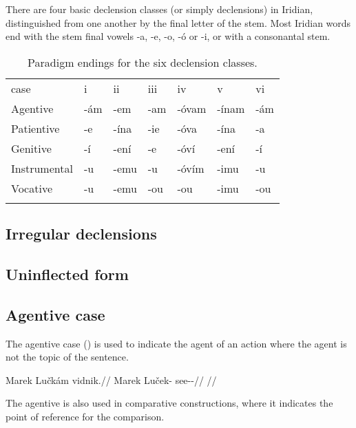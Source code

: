 There are four basic declension classes (or simply declensions) in Iridian, distinguished from one another by the final letter of the stem. Most Iridian words end with the stem final vowels -a, -e, -o, -ó or -i, or with a consonantal stem.


\begin{table}[h]
    \footnotesize\sffamily
    \caption{Paradigm endings for the six declension classes.}
    \medskip
    \begin{tabu} to 
    \toprule\addlinespace
            {\sc case}          &{\sc i} &{\sc ii} & {\sc iii} &{\sc iv} &{\sc v} &{\sc vi} \\ \addlinespace
    \midrule\addlinespace
        Agentive    & -ám   & -em     & -am    & -óvam  & -ínam    & -ám\\ \addlinespace
        Patientive  & -e      & -ína  & -ie    & -óva   & -ína     & -a\\ \addlinespace
        Genitive    & -í    & -ení  & -e & -óví & -ení     & -í\\ \addlinespace
        Instrumental& -u      & -emu    & -u     & -óvím  & -imu       & -u\\ \addlinespace
        Vocative    & -u      & -emu    & -ou    & -ou      & -imu       & -ou\\ \addlinespace
    \bottomrule
    \end{tabu}
\end{table}


\subsection{Irregular declensions}

\subsection{Uninflected form}


\subsection{Agentive case}

The agentive case (\Agt{}) is used to indicate the agent of an action where the agent is not the topic of the sentence.

\pex
\begingl
\gla Marek Lučkám vidnik.//
\glb Marek Luček-\Agt{} see-\Pv{}-\Pf{}//
\glft {}//
\endgl
\xe

The agentive is also used in comparative constructions, where it indicates the point of reference for the comparison.

